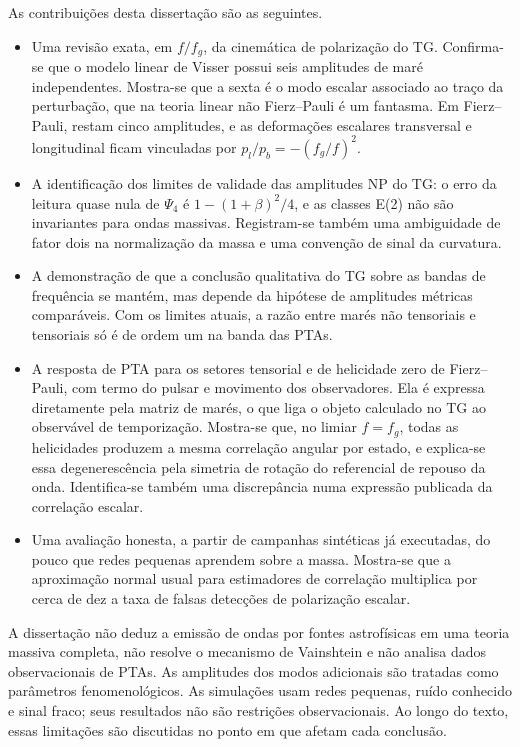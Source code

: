 As contribuições desta dissertação são as seguintes.
\begin{itemize}
 \item Uma revisão exata, em $f/f_g$, da cinemática de polarização do TG.
 Confirma-se que o modelo linear de Visser possui seis amplitudes de maré
 independentes. Mostra-se que a sexta é o modo escalar associado ao traço
 da perturbação, que na teoria linear não Fierz--Pauli é um fantasma. Em
 Fierz--Pauli, restam cinco amplitudes, e as deformações escalares
 transversal e longitudinal ficam vinculadas por
 $p_l/p_b=-(f_g/f)^2$.
 \item A identificação dos limites de validade das amplitudes NP do TG:
 o erro da leitura quase nula de $\Psi_4$ é
 $1-(1+\beta)^2/4$, e as classes E(2) não são invariantes para ondas
 massivas. Registram-se também uma ambiguidade de fator dois na
 normalização da massa e uma convenção de sinal da curvatura.
 \item A demonstração de que a conclusão qualitativa do TG sobre as bandas
 de frequência se mantém, mas depende da hipótese de amplitudes métricas
 comparáveis. Com os limites atuais, a razão entre marés não tensoriais
 e tensoriais só é de ordem um na banda das PTAs.
 \item A resposta de PTA para os setores tensorial e de helicidade zero
 de Fierz--Pauli, com termo do pulsar e movimento dos observadores. Ela
 é expressa diretamente pela matriz de marés, o que liga o objeto
 calculado no TG ao observável de temporização. Mostra-se que, no limiar
 $f=f_g$, todas as helicidades produzem a mesma correlação angular por
 estado, e explica-se essa degenerescência pela simetria de rotação do
 referencial de repouso da onda. Identifica-se também uma discrepância
 numa expressão publicada da correlação escalar.
 \item Uma avaliação honesta, a partir de campanhas sintéticas já
 executadas, do pouco que redes pequenas aprendem sobre a massa. Mostra-se
 que a aproximação normal usual para estimadores de correlação multiplica
 por cerca de dez a taxa de falsas detecções de polarização escalar.
\end{itemize}

A dissertação não deduz a emissão de ondas por fontes astrofísicas em uma
teoria massiva completa, não resolve o mecanismo de Vainshtein e não
analisa dados observacionais de PTAs. As amplitudes dos modos adicionais
são tratadas como parâmetros fenomenológicos. As simulações usam redes
pequenas, ruído conhecido e sinal fraco; seus resultados não são
restrições observacionais. Ao longo do texto, essas limitações são
discutidas no ponto em que afetam cada conclusão.

